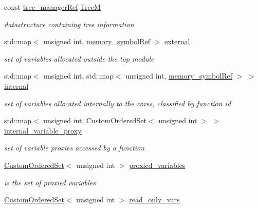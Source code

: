 \begin{DoxyCompactItemize}
\item 
const \hyperlink{tree__manager_8hpp_a96ff150c071ce11a9a7a1e40590f205e}{tree\+\_\+manager\+Ref} \hyperlink{classmemory_a6806f41edbd2ce52a84c3ba452d011f3}{TreeM}
\begin{DoxyCompactList}\small\item\em datastructure containing tree information \end{DoxyCompactList}\item 
std\+::map$<$ unsigned int, \hyperlink{memory__symbol_8hpp_af3608dbc27177447c2d777fa712cc82a}{memory\+\_\+symbol\+Ref} $>$ \hyperlink{classmemory_ae45a5824c5d97979940f500436f1e1a7}{external}
\begin{DoxyCompactList}\small\item\em set of variables allocated outside the top module \end{DoxyCompactList}\item 
std\+::map$<$ unsigned int, std\+::map$<$ unsigned int, \hyperlink{memory__symbol_8hpp_af3608dbc27177447c2d777fa712cc82a}{memory\+\_\+symbol\+Ref} $>$ $>$ \hyperlink{classmemory_af2efbd3f5b71e458681d8c971e2dfbee}{internal}
\begin{DoxyCompactList}\small\item\em set of variables allocated internally to the cores, classified by function id \end{DoxyCompactList}\item 
std\+::map$<$ unsigned int, \hyperlink{classCustomOrderedSet}{Custom\+Ordered\+Set}$<$ unsigned int $>$ $>$ \hyperlink{classmemory_a45fb0aa269feeca220af83356be42e11}{internal\+\_\+variable\+\_\+proxy}
\begin{DoxyCompactList}\small\item\em set of variable proxies accessed by a function \end{DoxyCompactList}\item 
\hyperlink{classCustomOrderedSet}{Custom\+Ordered\+Set}$<$ unsigned int $>$ \hyperlink{classmemory_adec2a898a9a834d8b15d565c418689ed}{proxied\+\_\+variables}
\begin{DoxyCompactList}\small\item\em is the set of proxied variables \end{DoxyCompactList}\item 
\hyperlink{classCustomOrderedSet}{Custom\+Ordered\+Set}$<$ unsigned int $>$ \hyperlink{classmemory_a65ec8ddee58a43fd84b238d5a79daf7d}{read\+\_\+only\+\_\+vars}
\item 

\end{DoxyCompactItemize}
